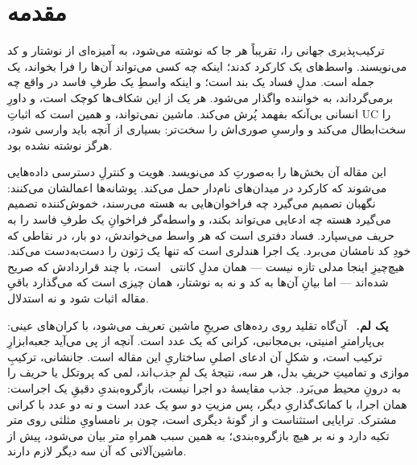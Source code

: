 \documentclass[10pt,oneside,openany]{book}
\makeatletter
\newcommand{\nav@headtext}{}
\newcommand{\chapterheadstar}[1]{\gdef\nav@headtext{#1}}
\newcommand{\heading}[1]{\medskip\par\noindent\textcolor{accent}{\textbf{#1.}}\ }
\theoremstyle{accentdef}
\theoremstyle{accentplain}
\makeatother
\begin{document}
\clearpage
\chapterheadstar{فهرست مطالب}
\hypertarget{toc}{}%
{\setlength{\parskip}{0pt}\tableofcontents}

{}
\chapter*{مقدمه}
\chapterheadstar{مقدمه}

ترکیب‌پذیری جهانی را، تقریباً هر جا که نوشته می‌شود، به آمیزه‌ای از
نوشتار و کد می‌نویسند. واسط‌های یک کارکرد کدند؛ اینکه چه کسی می‌تواند
آن‌ها را فرا بخواند، یک جمله است. مدلِ فساد یک بند است؛ و اینکه واسطِ یک
طرفِ فاسد در واقع چه برمی‌گرداند، به خواننده واگذار می‌شود. هر یک از این
شکاف‌ها کوچک است، و داورِ انسانی بی‌آنکه بفهمد پُرش می‌کند. ماشین نمی‌تواند،
و همین است که اثباتِ UC را سخت‌ابطال می‌کند و وارسیِ صوری‌اش را سخت‌تر:
بسیاری از آنچه باید وارسی شود، هرگز نوشته نشده بود.

این مقاله آن بخش‌ها را به‌صورتِ کد می‌نویسد. هویت و کنترلِ دسترسی
داده‌هایی می‌شوند که کارکرد در میدان‌های نام‌دار حمل می‌کند. پوشانه‌ها
اعمالشان می‌کنند: نگهبان تصمیم می‌گیرد چه فراخوان‌هایی به هسته می‌رسند،
خموش‌کننده تصمیم می‌گیرد هسته چه ادعایی می‌تواند بکند، و واسطه‌گر
فراخوانِ یک طرفِ فاسد را به حریف می‌سپارد. فساد دفتری است که هر واسط
می‌خواندش، دو بار، در نقاطی که خودِ کد نامشان می‌برد. یک اجرا هندلری است
که تنها یک ژتون را دست‌به‌دست می‌کند. هیچ‌چیزِ اینجا مدلی تازه نیست ---
همان مدلِ کانتی~\cite{Canetti20} است، با چند قراردادش که صریح شده‌اند ---
اما بیانِ آن‌ها به کد و نه به نوشتار، همان چیزی است که می‌گذارد باقیِ
مقاله اثبات شود و نه استدلال.

\heading{یک لم} آن‌گاه تقلید روی رده‌های صریحِ ماشین تعریف می‌شود، با
کران‌های عینی: بی‌پارامترِ امنیتی، بی‌مجانبی، کرانی که یک عدد است. آنچه
از پی می‌آید جعبه‌ابزارِ ترکیب است، و شکلِ آن ادعای اصلیِ ساختاریِ این
مقاله است. جانشانی، ترکیبِ موازی و تمامیتِ حریفِ بدل، هر سه، نتیجهٔ یک لمِ
\emph{جذب}‌اند، لمی که پروتکل یا حریف را به درونِ محیط می‌بَرد. جذب مقایسهٔ
دو اجرا نیست، بازگروه‌بندیِ دقیقِ یک اجراست: همان اجرا، با کمانک‌گذاریِ
دیگر، پس مزیتِ دو سو یک عدد است و نه دو عدد با کرانی مشترک. ترایایی
استثناست و از گونهٔ دیگری است، چون بر نامساویِ مثلثی روی متر تکیه دارد و
نه بر هیچ بازگروه‌بندی؛ به همین سبب همراهِ متر بیان می‌شود، پیش از
ماشین‌آلاتی که آن سه دیگر لازم دارند.
\end{document}
